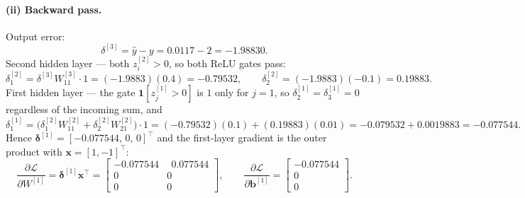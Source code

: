 \documentclass[11pt,a4paper]{article}
\begin{document}
\paragraph{(ii) Backward pass.} Output error:
\[
\delta^{[3]}=\hat{y}-y=0.0117-2=\boxed{-1.98830}.
\]
Second hidden layer --- both $z^{[2]}_i>0$, so both ReLU gates pass:
\[
\delta^{[2]}_1=\delta^{[3]}W^{[3]}_{11}\cdot 1=(-1.9883)(0.4)=-0.79532,
\qquad
\delta^{[2]}_2=(-1.9883)(-0.1)=0.19883 .
\]
First hidden layer --- the gate $\mathbf{1}[z^{[1]}_j>0]$ is $1$ only for $j=1$, so
$\delta^{[1]}_2=\delta^{[1]}_3=0$ regardless of the incoming sum, and
\[
\delta^{[1]}_1=\big(\delta^{[2]}_1 W^{[2]}_{11}+\delta^{[2]}_2 W^{[2]}_{21}\big)\cdot 1
=(-0.79532)(0.1)+(0.19883)(0.01)
=-0.079532+0.0019883=\boxed{-0.077544}.
\]
Hence $\boldsymbol{\delta}^{[1]}=[-0.077544,\,0,\,0]^\top$ and the first-layer gradient is
the outer product with $\mathbf{x}=[1,-1]^\top$:
\[
\frac{\partial\mathcal{L}}{\partial W^{[1]}}
=\boldsymbol{\delta}^{[1]}\mathbf{x}^\top
=\begin{bmatrix}-0.077544&\ \ 0.077544\\0&0\\0&0\end{bmatrix},
\qquad
\frac{\partial\mathcal{L}}{\partial \mathbf{b}^{[1]}}
=\begin{bmatrix}-0.077544\\0\\0\end{bmatrix}.
\]
\end{document}
